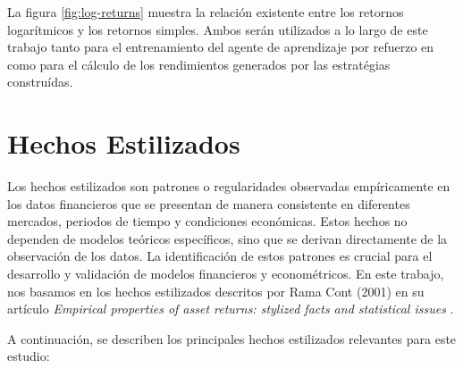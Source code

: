 \documentclass[a4paper,12pt, twoside]{report}
\begin{document}
La figura \ref{fig:log-returns} muestra la relación existente entre los retornos logarítmicos y los retornos simples.
Ambos serán utilizados a lo largo de este trabajo tanto para el entrenamiento del agente de aprendizaje por refuerzo en
como para el cálculo de los rendimientos generados por las estratégias construídas.

\section{Hechos Estilizados}

Los hechos estilizados son patrones o regularidades observadas empíricamente en los datos financieros que se 
presentan de manera consistente en diferentes mercados, periodos de tiempo y condiciones económicas. Estos hechos 
no dependen de modelos teóricos específicos, sino que se derivan directamente de la observación de los datos. La 
identificación de estos patrones es crucial para el desarrollo y validación de modelos financieros y econométricos. 
En este trabajo, nos basamos en los hechos estilizados descritos por Rama Cont (2001) en su artículo \textit{Empirical 
properties of asset returns: stylized facts and statistical issues} \cite{Cont2001}.

A continuación, se describen los principales hechos estilizados relevantes para este estudio:
\end{document}
